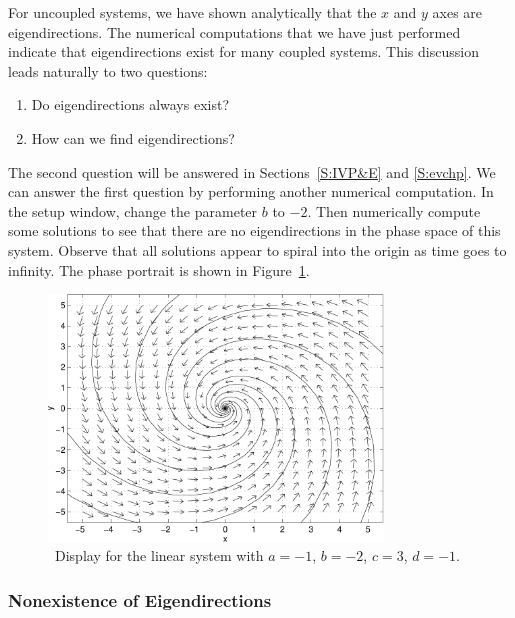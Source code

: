 \documentclass{ximera}
\begin{document}
For uncoupled systems, we have shown analytically that the $x$
and $y$ axes are eigendirections.  The numerical computations
that we have just performed indicate that eigendirections exist
for many coupled systems.  This discussion leads naturally to
two questions:
\begin{enumerate}
\item Do eigendirections always exist?
\item How can we find eigendirections?
\end{enumerate}
The second question will be answered in Sections~\ref{S:IVP&E} and 
\ref{S:evchp}.  We can answer the first question by performing another 
numerical computation.  In the setup window, change the parameter $b$ 
to $-2$.  Then numerically compute some solutions to see that there
are no eigendirections in the phase space of this system.  Observe that
all solutions appear to spiral into the origin as time goes to
infinity.  The phase portrait is shown in Figure~\ref{pp_dsp2}.
\begin{figure}[htb]
      \centerline{%
      \includegraphics[width=3.5in]{../figures/pp_dsp2.pdf}}
      \caption{{\sf \PPLANE\ Display} for the {\sf linear system}
		with $a=-1$, $b=-2$, $c=3$, $d=-1$.}
      \label{pp_dsp2}
\end{figure}


\subsubsection*{Nonexistence of Eigendirections}
\end{document}
